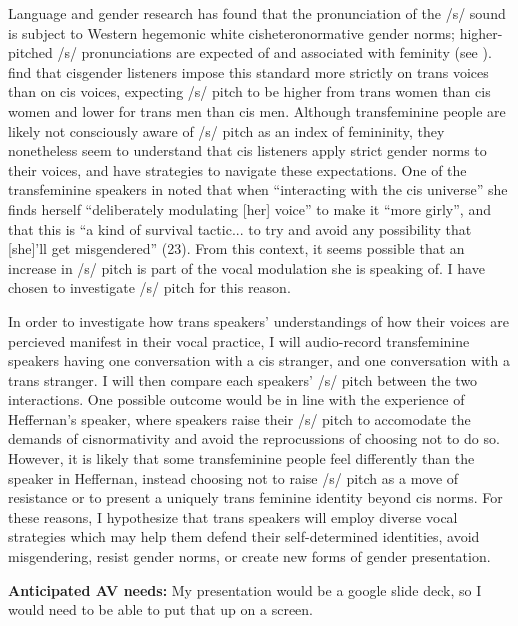 \documentclass[11pt]{article}
\begin{document}
Language and gender research has found that the pronunciation of the /s/ sound is subject to Western hegemonic white cisheteronormative gender norms; higher-pitched /s/ pronunciations are expected of and associated with feminity (see \cite{calder_gay_2020}). \textcite{jessee_cisgender_2025} find that cisgender listeners impose this standard more strictly on trans voices than on cis voices, expecting /s/ pitch to be higher from trans women than cis women and lower for trans men than cis men. Although transfeminine people are likely not consciously aware of /s/ pitch as an index of femininity, they nonetheless seem to understand that cis listeners apply strict gender norms to their voices, and have strategies to navigate these expectations. One of the transfeminine speakers in \textcite{heffernan_constructing_2023} noted that when ``interacting with the cis universe'' she finds herself ``deliberately modulating [her] voice'' to make it ``more girly'', and that this is ``a kind of survival tactic... to try and avoid any possibility that [she]'ll get misgendered'' (23). From this context, it seems possible that an increase in /s/ pitch is part of the vocal modulation she is speaking of. I have chosen to investigate /s/ pitch for this reason. 

In order to investigate how trans speakers' understandings of how their voices are percieved manifest in their vocal practice, I will audio-record transfeminine speakers having one conversation with a cis stranger, and one conversation with a trans stranger. I will then compare each speakers' /s/ pitch between the two interactions. One possible outcome would be in line with the experience of Heffernan's speaker, where speakers raise their /s/ pitch to accomodate the demands of cisnormativity and avoid the reprocussions of choosing not to do so. However, it is likely that some transfeminine people feel differently than the speaker in Heffernan, instead choosing not to raise /s/ pitch as a move of resistance or to present a uniquely trans feminine identity beyond cis norms. For these reasons, I hypothesize that trans speakers will employ diverse vocal strategies which may help them defend their self-determined identities, avoid misgendering, resist gender norms, or create new forms of gender presentation.

\textbf{Anticipated AV needs:}
My presentation would be a google slide deck, so I would need to be able to put that up on a screen.

\printbibliography
\end{document}
